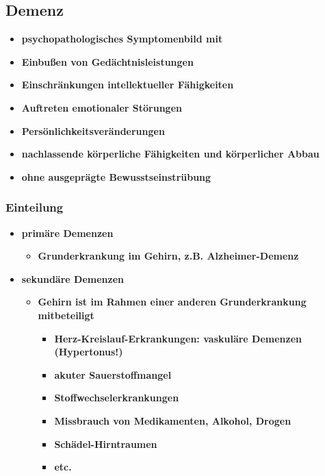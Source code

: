 	\subsection{Demenz}
		\begin{itemize}
			\item \textbf{psychopathologisches Symptomenbild mit}
			\item \textbf{Einbußen von Gedächtnisleistungen}
			\item \textbf{Einschränkungen intellektueller Fähigkeiten}
			\item \textbf{Auftreten emotionaler Störungen}
			\item \textbf{Persönlichkeitsveränderungen}
			\item \textbf{nachlassende körperliche Fähigkeiten und körperlicher Abbau}
			\item \textbf{ohne ausgeprägte Bewusstseinstrübung}
		\end{itemize}
		\subsubsection{Einteilung}
			\begin{itemize}
				\item \textbf{primäre Demenzen}
					\begin{itemize}
						\item \textbf{Grunderkrankung im Gehirn, z.B. Alzheimer-Demenz}
					\end{itemize}
				\item \textbf{sekundäre Demenzen}
					\begin{itemize}
						\item \textbf{Gehirn ist im Rahmen einer anderen Grunderkrankung mitbeteiligt}
							\begin{itemize}
								\item \textbf{Herz-Kreislauf-Erkrankungen: vaskuläre Demenzen (Hypertonus!)}
								\item \textbf{akuter Sauerstoffmangel}
								\item \textbf{Stoffwechselerkrankungen}
								\item \textbf{Missbrauch von Medikamenten, Alkohol, Drogen}
								\item \textbf{Schädel-Hirntraumen}
								\item \textbf{etc.}
							\end{itemize}
					\end{itemize}
			\end{itemize}
